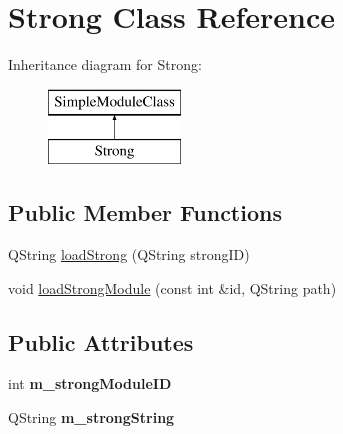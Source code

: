 \hypertarget{classStrong}{
\section{Strong Class Reference}
\label{classStrong}
}
Inheritance diagram for Strong:\begin{figure}[H]
\begin{center}
\leavevmode
\includegraphics[height=2cm]{classStrong}
\end{center}
\end{figure}
\subsection*{Public Member Functions}
\begin{DoxyCompactItemize}
\item 
QString \hyperlink{classStrong_a959af8bb7edc87e78c04f73837094724}{loadStrong} (QString strongID)
\item 
void \hyperlink{classStrong_ac29b6ad75969dd5ef690a82c15e18fe1}{loadStrongModule} (const int \&id, QString path)
\end{DoxyCompactItemize}
\subsection*{Public Attributes}
\begin{DoxyCompactItemize}
\item 
\hypertarget{classStrong_aca45c05b0f595a36f1ad9df3db509194}{
int {\bfseries m\_\-strongModuleID}}
\label{classStrong_aca45c05b0f595a36f1ad9df3db509194}

\item 
\hypertarget{classStrong_abd906be91ce0b70cc0b779da3ee65317}{
QString {\bfseries m\_\-strongString}}
\label{classStrong_abd906be91ce0b70cc0b779da3ee65317}

\end{DoxyCompactItemize}


